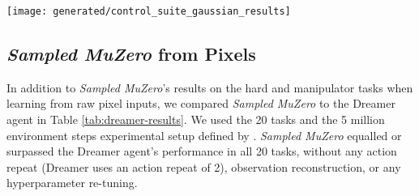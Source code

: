 \documentclass{article}
\newcommand{\smuzero}{\emph{Sampled MuZero}}
\begin{document}
\begin{figure*}
\texttt{[image: generated/control\_suite\_gaussian\_results]}
\vspace*{-7mm}
\caption[]{
\label{fig:control-suite-gaussian-results}
\textbf{Comparison between a Categorical and Gaussian parameterisation of the policy prediction for \smuzero{}.} Performance of \smuzero{} (3 seeds per experiment) throughout training on the DM Control Hard and Manipulator tasks.
}
\end{figure*}

\subsection{\smuzero{} from Pixels}
\label{dreamer}
In addition to \smuzero{}'s results on the hard and manipulator tasks when learning from raw pixel inputs, we compared \smuzero{} to the Dreamer agent \cite{hafner2019dream} in Table \ref{tab:dreamer-results}. We used the 20 tasks and the 5 million environment steps experimental setup defined by \cite{hafner2019dream}. \smuzero{} equalled or surpassed the Dreamer agent's performance in all 20 tasks, without any action repeat (Dreamer uses an action repeat of 2), observation reconstruction, or any hyperparameter re-tuning.
\end{document}
